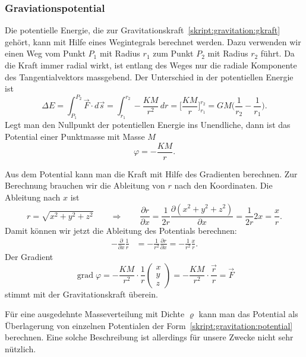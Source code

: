 \subsubsection{Graviationspotential}
Die potentielle Energie, die zur
Gravitationskraft~\eqref{skript:gravitation:gkraft} gehört, kann
mit Hilfe eines Wegintegrals berechnet werden.
Dazu verwenden wir einen Weg vom Punkt $P_1$ mit Radius $r_1$
zum Punkt $P_2$ mit Radius $r_2$ führt.
Da die Kraft immer radial wirkt, ist entlang des Weges nur die radiale
Komponente des Tangentialvektors massgebend.
Der Unterschied in der potentiellen Energie ist
\[
\Delta E
=
\int_{P_1}^{P_2} \vec F\cdot d\vec s
=
\int_{r_1}^{r_2} -\frac{KM}{r^2}\,dr
=
\biggl[
\frac{KM}{r}
\biggr]_{r_1}^{r_2}
=
GM\biggl(\frac{1}{r_2}-\frac{1}{r_1}\biggr).
\]
Legt man den Nullpunkt der potentiellen Energie ins Unendliche, dann ist
das Potential einer Punktmasse mit Masse $M$
\begin{equation}
\varphi = -\frac{KM}{r}.
\label{skript:gravitation:potential}
\end{equation}

Aus dem Potential kann man die Kraft mit Hilfe des Gradienten
berechnen.
Zur Berechnung brauchen wir die Ableitung von $r$ nach den Koordinaten.
Die Ableitung nach $x$ ist
\[
r=\sqrt{x^2+y^2+z^2}
\qquad\Rightarrow\qquad
\frac{\partial r}{\partial x}
=
\frac{1}{2r} \frac{\partial (x^2+y^2+z^2)}{\partial x}
=
\frac{1}{2r} 2x=\frac{x}{r}.
\]
Damit können wir jetzt die Ableitung des Potentials berechnen:
\begin{align*}
-\frac{\partial}{\partial x}\frac1{r}
&=
-\frac{1}{r^2} \frac{\partial r}{\partial x}
=
-\frac{1}{r^2} \frac{x}{r}.
\end{align*}
Der Gradient
\[
\operatorname{grad}\varphi
=
-\frac{KM}{r^2}\cdot\frac1r\begin{pmatrix}x\\y\\z\end{pmatrix}
=
-\frac{KM}{r^2}\cdot\frac{\vec r}{r} = \vec F
\]
stimmt mit der Gravitationskraft überein.

Für eine ausgedehnte Masseverteilung mit Dichte $\varrho$ kann man das
Potential als Überlagerung von einzelnen Potentialen der
Form~\eqref{skript:gravitation:potential} berechnen.
Eine solche Beschreibung
ist allerdings für unsere Zwecke nicht sehr nützlich.

